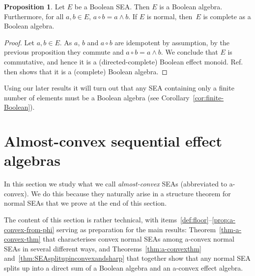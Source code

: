\documentclass[a4paper, onecolumn, accepted=2020-12-22]{quantumarticle}
\newcommand{\mult}{\mathop{\circ}}
\newcounter{counter}
\theoremstyle{definition}
\newtheorem{proposition}[counter]{Proposition}
\begin{document}
\begin{proposition}\label{prop:SEAsharpisBoolean}
    Let $E$ be a Boolean SEA.
    Then $E$ is a Boolean algebra.
    Furthermore, for all $a,b \in E$, $a\mult
    b = a\wedge b$. If $E$ is normal, then~$E$ is complete as a Boolean
    algebra.
\end{proposition}
\begin{proof}
    Let $a,b\in E$. As $a$, $b$ and $a\mult b$ are idempotent by
    assumption, by the previous proposition they commute and $a\mult
    b  = a\wedge b$. We conclude that $E$ is commutative, and hence
    it is a (directed-complete) Boolean effect monoid. Ref.~\cite[Proposition~47]{first} then shows that it is a (complete) Boolean algebra.
\end{proof}

Using our later results it will turn out that any SEA containing only a finite number of elements must be a Boolean algebra (see Corollary~\ref{cor:finite-Boolean}).

\section{Almost-convex sequential effect algebras}\label{sec:almostconvex}

In this section we study what we call \emph{almost-convex} SEAs (abbreviated to a-convex). We do this because they naturally arise in a structure theorem for normal SEAs that we prove at the end of this section.

The content of this section is rather technical, with items~\ref{def:floor}--\ref{prop:a-convex-from-phi} serving as preparation for the main results: Theorem~\ref{thm-a-convex-thm} that characterises convex normal SEAs among a-convex normal SEAs in several different ways, and Theorems~\ref{thm:a-convexthm} and~\ref{thm:SEAsplitupinconvexandsharp} that together show that any normal SEA splits up into a direct sum of a Boolean algebra and an a-convex effect algebra.
\end{document}
